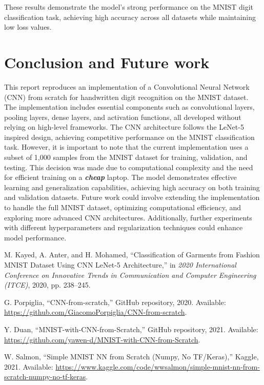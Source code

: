 \documentclass[conference]{IEEEtran}
\begin{document}
These results demonstrate the model's strong performance on the MNIST digit classification task, achieving high accuracy across all datasets while maintaining low loss values.

\section{Conclusion and Future work}
This report reproduces an implementation of a Convolutional Neural Network (CNN) from scratch for handwritten digit recognition on the MNIST dataset. The implementation includes essential components such as convolutional layers, pooling layers, dense layers, and activation functions, all developed without relying on high-level frameworks. The CNN architecture follows the LeNet-5 inspired design, achieving competitive performance on the MNIST classification task.
However, it is important to note that the current implementation uses a subset of 1,000 samples from the MNIST dataset for training, validation, and testing. This decision was made due to computational complexity and the need for efficient training on a \textit{\textbf{cheap}} laptop. The model demonstrates effective learning and generalization capabilities, achieving high accuracy on both training and validation datasets.
Future work could involve extending the implementation to handle the full MNIST dataset, optimizing computational efficiency, and exploring more advanced CNN architectures. Additionally, further experiments with different hyperparameters and regularization techniques could enhance model performance.

\begin{thebibliography}{00}

 M. Kayed, A. Anter, and H. Mohamed, ``Classification of Garments from Fashion MNIST Dataset Using CNN LeNet-5 Architecture,'' in \textit{2020 International Conference on Innovative Trends in Communication and Computer Engineering (ITCE)}, 2020, pp. 238--245.

 G. Porpiglia, ``CNN-from-scratch,'' GitHub repository, 2020. Available: \url{https://github.com/GiacomoPorpiglia/CNN-from-scratch}.

 Y. Duan, ``MNIST-with-CNN-from-Scratch,'' GitHub repository, 2021. Available: \url{https://github.com/yawen-d/MNIST-with-CNN-from-Scratch}.

 W. Salmon, ``Simple MNIST NN from Scratch (Numpy, No TF/Keras),'' Kaggle, 2021. Available: \url{https://www.kaggle.com/code/wwsalmon/simple-mnist-nn-from-scratch-numpy-no-tf-keras}.

\end{thebibliography}
\end{document}
